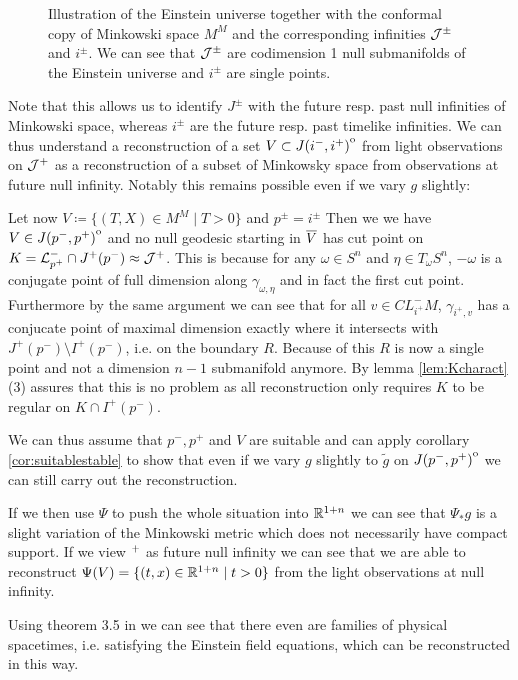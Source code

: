\begin{figure}\label{fig:EU}
    \centering
    
    \caption{
        Illustration of the Einstein universe together with the conformal copy of Minkowski space $M^M$ and the corresponding infinities ${\mathcal{J}}^\pm$ and $i^\pm$. We can see that ${\mathcal{J^\pm}}$ are codimension 1 null submanifolds of the Einstein universe and $i^\pm$ are single points.
    }
\end{figure}
Note that this allows us to identify $J^\pm$ with the future resp. past null infinities of Minkowski space, whereas $i^\pm$ are the future resp. past timelike infinities.
We can thus understand a reconstruction of a set $V\subset {\kern0ptJ(i^-,i^+)}^{\mathrm{o}}$ from light observations on ${\mathcal{J}}^+$ as a reconstruction of a subset of Minkowsky space from observations at future null infinity. Notably this remains possible even if we vary $g$ slightly:
\begin{example}Let now $V\coloneqq  \{(T,X)\in M^M \mid T>0\}$ and $p^\pm = i^\pm$ Then we we have $V\in {\kern0ptJ(p^-,p^+)}^{\mathrm{o}}$ and no null geodesic starting in ${\overline{V}}$ has cut point on $K={\mathcal{L}}^-_{p^+}\cap J^+(p^-) \approx {\mathcal{J}}^+$. This is because for any $\omega \in S^n$ and $\eta\in T_\omega S^n$, $-\omega$ is a conjugate point of full dimension along $\gamma_{\omega,\eta}$ and in fact the first cut point. Furthermore by the same argument we can see that for all $v\in CL^-_{i^+}M$, $\gamma_{i^+,v}$ has a conjucate point of maximal dimension exactly where it intersects with $J^+(p^-)\setminus I^+(p^-)$, i.e. on the boundary $R$. Because of this $R$ is now a single point and not a dimension $n-1$ submanifold anymore. By lemma \ref{lem:Kcharact}(3) assures that this is no problem as all reconstruction only requires $K$ to be regular on $K\cap I^+(p^-)$.

We can thus assume that $p^-,p^+$ and $V$ are suitable and can apply corollary \ref{cor:suitablestable} to show that even if we vary $g$ slightly to $\widetilde{g}$ on ${\kern0ptJ(p^-,p^+)}^{\mathrm{o}}$ we can still carry out the reconstruction. 

If we then use $\Psi$ to push the whole situation into $\mathbb{R}^{1+n}$ we can see that $\Psi_*g$ is a slight variation of the Minkowski metric which does not necessarily have compact support. If we view ${\mathcal{}}^+$ as future null infinity we can see that we are able to reconstruct $\Psi(V) = \{(t,x)\in \mathbb{R}^{1+n} \mid t>0\}$ from the light observations at null infinity.

Using theorem 3.5 in \cite{friedrichspacetime} we can see that there even are families of physical spacetimes, i.e. satisfying the Einstein field equations, which can be reconstructed in this way.
\end{example}
